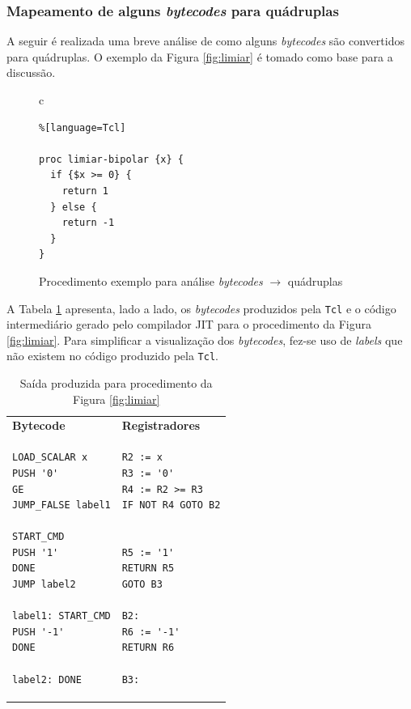 \subsubsection{Mapeamento de alguns \textit{bytecodes} para quádruplas}

A seguir é realizada uma breve análise de como alguns
\textit{bytecodes} são convertidos para quádruplas. O exemplo da
Figura \ref{fig:limiar} é tomado como base para a discussão.

\begin{figure}[h]
  \centering
  \begin{tabular}{c}
    \begin{lstlisting}%[language=Tcl]

proc limiar-bipolar {x} {
  if {$x >= 0} {
    return 1
  } else {
    return -1
  }
}
    \end{lstlisting}
  \end{tabular}
  \caption{Procedimento exemplo para análise \textit{bytecodes}
    $\rightarrow$ quádruplas\label{fig:limiar}}
\label{xx$xx}
\end{figure}

A Tabela \ref{tabela1} apresenta, lado a lado, os \textit{bytecodes}
produzidos pela \texttt{Tcl} e o código intermediário gerado pelo
compilador JIT para o procedimento
da Figura \ref{fig:limiar}. Para simplificar a visualização dos
\textit{bytecodes}, fez-se uso de \textit{labels} que não existem no
código produzido pela \texttt{Tcl}.

\begin{table}[h]
  \centering
  \caption{Saída produzida para procedimento da Figura \ref{fig:limiar} \label{tabela1}}
  \begin{tabular}{| p{4cm} | p{4cm} |}
    \hline
    \bf{Bytecode} & \bf{Registradores} \\
\begin{verbatim}
LOAD_SCALAR x
PUSH '0'
GE
JUMP_FALSE label1

START_CMD
PUSH '1'
DONE
JUMP label2

label1: START_CMD
PUSH '-1'
DONE

label2: DONE
\end{verbatim} &
\begin{verbatim}
R2 := x
R3 := '0'
R4 := R2 >= R3
IF NOT R4 GOTO B2


R5 := '1'
RETURN R5
GOTO B3

B2:
R6 := '-1'
RETURN R6

B3:
\end{verbatim} \\
    \hline
  \end{tabular}
\end{table}


